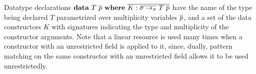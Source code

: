 \documentclass[acmsmall,review,screen]{acmart}
\begin{document}

Datatype declarations $\mathbf{data}~T~\overline{p}~\mathbf{where}~\overline{K:\overline{\sigma
\to_\pi}~T~\overline{p} }$ have the name of the type being declared $T$
parametrized over multiplicity variables $\overline{p}$, and a set of the data
constructors $K$ with signatures indicating the type and multiplicity of the
constructor arguments. Note that a linear resource is used many times when a
constructor with an unrestricted field is applied to it, since, dually, pattern
matching on the same constructor with an unrestricted field allows it to be
used unrestrictedly.

\SyntaxFull


\end{document}

